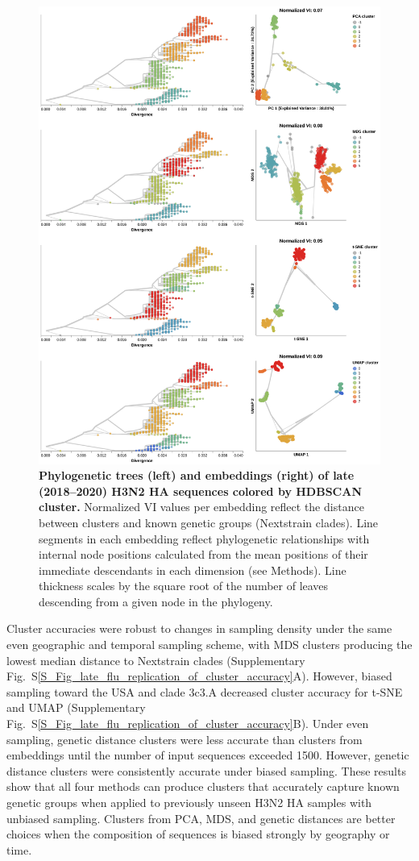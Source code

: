 \documentclass[webpdf,contemporary,large,single]{oup-authoring-template}%
\theoremstyle{thmstyleone}%
\theoremstyle{thmstyletwo}%
\theoremstyle{thmstylethree}%
\begin{document}
\begin{figure}[!h]
\includegraphics[width=0.9\columnwidth]{figures/flu-2018-2020-ha-embeddings-by-cluster.png}
\caption{{\bf Phylogenetic trees (left) and embeddings (right) of late (2018--2020) H3N2 HA sequences colored by HDBSCAN cluster.}
  Normalized VI values per embedding reflect the distance between clusters and known genetic groups (Nextstrain clades).
  Line segments in each embedding reflect phylogenetic relationships with internal node positions calculated from the mean positions of their immediate descendants in each dimension (see Methods).
  Line thickness scales by the square root of the number of leaves descending from a given node in the phylogeny.}
\label{fig:seasonal-influenza-h3n2-ha-2018-2020-clusters}
\end{figure}

Cluster accuracies were robust to changes in sampling density under the same even geographic and temporal sampling scheme, with MDS clusters producing the lowest median distance to Nextstrain clades (Supplementary Fig.~S\ref{S_Fig_late_flu_replication_of_cluster_accuracy}A).
However, biased sampling toward the USA and clade 3c3.A decreased cluster accuracy for t-SNE and UMAP (Supplementary Fig.~S\ref{S_Fig_late_flu_replication_of_cluster_accuracy}B).
Under even sampling, genetic distance clusters were less accurate than clusters from embeddings until the number of input sequences exceeded 1500.
However, genetic distance clusters were consistently accurate under biased sampling.
These results show that all four methods can produce clusters that accurately capture known genetic groups when applied to previously unseen H3N2 HA samples with unbiased sampling.
Clusters from PCA, MDS, and genetic distances are better choices when the composition of sequences is biased strongly by geography or time.
\end{document}
